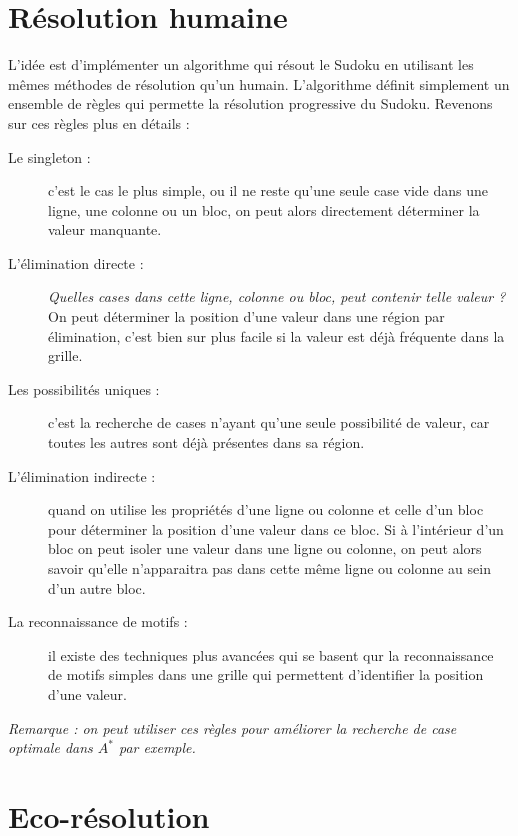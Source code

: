     \section{Résolution humaine}
        L'idée est d'implémenter un algorithme qui résout le Sudoku en utilisant les mêmes méthodes de résolution qu'un humain. L'algorithme définit simplement un ensemble de règles qui permette la résolution progressive du Sudoku. Revenons sur ces règles plus en détails :
        \begin{description}
            \item[Le singleton :] c'est le cas le plus simple, ou il ne reste qu'une seule case vide dans une ligne, une colonne ou un bloc, on peut alors directement déterminer la valeur manquante.
            \item[L'élimination directe :] \textit{Quelles cases dans cette ligne, colonne ou bloc, peut contenir telle valeur ?} On peut déterminer la position d'une valeur dans une région par élimination, c'est bien sur plus facile si la valeur est déjà fréquente dans la grille.
            \item[Les possibilités uniques :] c'est la recherche de cases n'ayant qu'une seule possibilité de valeur, car toutes les autres sont déjà présentes dans sa région.
            \item[L'élimination indirecte :] quand on utilise les propriétés d'une ligne ou colonne et celle d'un bloc pour déterminer la position d'une valeur dans ce bloc. Si à l'intérieur d'un bloc on peut isoler une valeur dans une ligne ou colonne, on peut alors savoir qu'elle n'apparaitra pas dans cette même ligne ou colonne au sein d'un autre bloc.
            \item[La reconnaissance de motifs :] il existe des techniques plus avancées qui se basent qur la reconnaissance de motifs simples dans une grille qui permettent d'identifier la position d'une valeur.
        \end{description}
        \textit{Remarque : on peut utiliser ces règles pour améliorer la recherche de case optimale dans $A^*$ par exemple.}
    \section{Eco-résolution}
